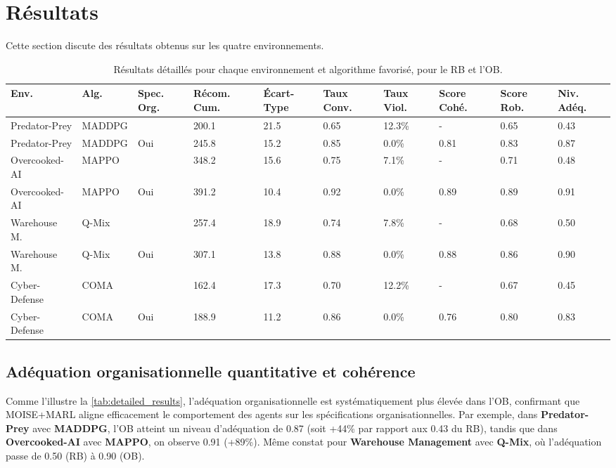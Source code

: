 \documentclass[dissemination]{jfsma}
\begin{document}
\section{Résultats}
\label{sec:results}

Cette section discute des résultats obtenus sur les quatre environnements.

\begin{table*}[h!]
    \centering
    \caption{Résultats détaillés pour chaque environnement et algorithme favorisé, pour le RB et l'OB.}
    \label{tab:detailed_results}
    \small
    \renewcommand{\arraystretch}{1.2}
    \begin{tabular}{p{2.2cm}p{1.6cm}p{.8cm}p{1.3cm}p{1cm}p{1.3cm}p{1.3cm}p{1.2cm}p{}p{0.8cm}}
        \hline
        \textbf{Env.} & \textbf{Alg.} & \textbf{Spec. Org.} & \textbf{Récom. Cum.} & \textbf{Écart-Type} & \textbf{Taux Conv.} & \textbf{Taux Viol.} & \textbf{Score Cohé.} & \textbf{Score Rob.} & \textbf{Niv. Adéq.} \\ \hline
        Predator-Prey & MADDPG &  & 200.1 & 21.5 & 0.65 & 12.3\% & - & 0.65 & 0.43 \\
        Predator-Prey & MADDPG & Oui & 245.8 & 15.2 & 0.85 & 0.0\% & 0.81 & 0.83 & 0.87 \\
        Overcooked-AI & MAPPO &  & 348.2 & 15.6 & 0.75 & 7.1\% & - & 0.71 & 0.48 \\
        Overcooked-AI & MAPPO & Oui & 391.2 & 10.4 & 0.92 & 0.0\% & 0.89 & 0.89 & 0.91 \\
        Warehouse M. & Q-Mix &  & 257.4 & 18.9 & 0.74 & 7.8\% & - & 0.68 & 0.50 \\
        Warehouse M. & Q-Mix & Oui & 307.1 & 13.8 & 0.88 & 0.0\% & 0.88 & 0.86 & 0.90 \\
        Cyber-Defense & COMA &  & 162.4 & 17.3 & 0.70 & 12.2\% & - & 0.67 & 0.45 \\
        Cyber-Defense & COMA & Oui & 188.9 & 11.2 & 0.86 & 0.0\% & 0.76 & 0.80 & 0.83 \\ \hline
    \end{tabular}
\end{table*}

\subsection{Adéquation organisationnelle quantitative et cohérence}

\noindent
Comme l'illustre la \autoref{tab:detailed_results}, l'adéquation organisationnelle est systématiquement plus élevée dans l'OB, confirmant que MOISE+MARL aligne efficacement le comportement des agents sur les spécifications organisationnelles. 
Par exemple, dans \textbf{Predator-Prey} avec \textbf{MADDPG}, l'OB atteint un niveau d'adéquation de 0.87 (soit +44\% par rapport aux 0.43 du RB), tandis que dans \textbf{Overcooked-AI} avec \textbf{MAPPO}, on observe 0.91 (+89\%). Même constat pour \textbf{Warehouse Management} avec \textbf{Q-Mix}, où l'adéquation passe de 0.50 (RB) à 0.90 (OB).
\end{document}
